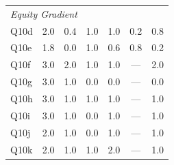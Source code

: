 \begin{table}[htbp]
\begin{tabular}{l|cccccc}
\midrule
\multicolumn{7}{l}{\textit{Equity Gradient}} \\
Q10d & 2.0 & 0.4 & 1.0 & 1.0 & 0.2 & 0.8 \\
Q10e & 1.8 & 0.0 & 1.0 & 0.6 & 0.8 & 0.2 \\
Q10f & 3.0 & 2.0 & 1.0 & 1.0 & --- & 2.0 \\
Q10g & 3.0 & 1.0 & 0.0 & 0.0 & --- & 0.0 \\
Q10h & 3.0 & 1.0 & 1.0 & 1.0 & --- & 1.0 \\
Q10i & 3.0 & 1.0 & 0.0 & 1.0 & --- & 1.0 \\
Q10j & 2.0 & 1.0 & 0.0 & 1.0 & --- & 1.0 \\
Q10k & 2.0 & 1.0 & 1.0 & 2.0 & --- & 1.0 \\
\bottomrule
\end{tabular}
\end{table}
